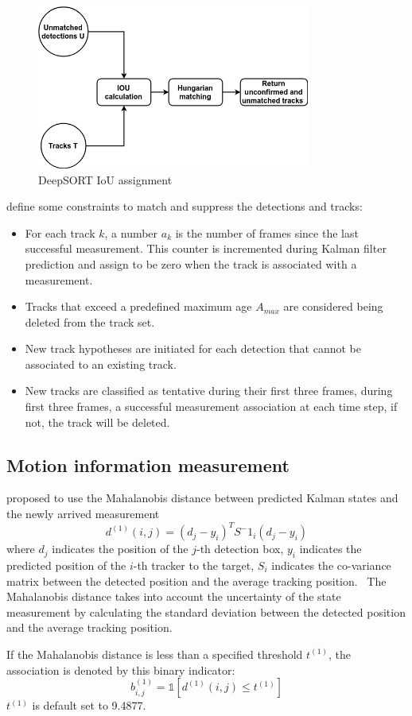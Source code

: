 \begin{figure}[h!]
    \centering
    \includegraphics[width=0.8\textwidth]{Chapters/Fig/Thesis_diagram-IOU.png}
    \caption{DeepSORT IoU assignment}
    \label{fig:org_iou}
\end{figure}

\pagebreak
\cite{Wojke2017simple} define some constraints to match and suppress the detections and tracks:
\begin{itemize}
    \item For each track $k$, a number $a_k$ is the number of frames since the last successful measurement. This counter is incremented during Kalman filter prediction and assign to be zero when the track is associated with a measurement.
    \item Tracks that exceed a predefined maximum age $A_{max}$ are considered being deleted from the track set.
    \item New track hypotheses are initiated for each detection that cannot be associated to an existing track.
    \item New tracks are classified as tentative during their first three frames, during first three frames, a successful measurement association at each time step, if not, the track will be deleted.
\end{itemize}
\subsection{Motion information measurement}
\hspace{0.5cm} \cite{Wojke2017simple} proposed to use the Mahalanobis distance between predicted Kalman states and the newly arrived measurement
\begin{equation}
    d^{(1)}(i,j) = (d_j - y_i)^TS^-1_i(d_j-y_i)
\end{equation}
where $d_j$ indicates the position of the $j$-th detection box, $y_i$ indicates the predicted position of the $i$-th 
tracker to the target, $S_i$ indicates the co-variance matrix between the detected position and the average tracking position. \
The Mahalanobis distance takes into account the uncertainty of the state measurement by calculating the standard deviation between the detected position and the average tracking position.\par
If the Mahalanobis distance is less than a specified threshold $t^{(1)}$, the association is denoted by this binary indicator:
\begin{equation}
    b^{(1)}_{i,j}=\mathbb{1}[d^{(1)}(i,j) \leq t^{(1)}]
\end{equation}
$t^{(1)}$ is default set to 9.4877.\cite{Wojke2017simple}

